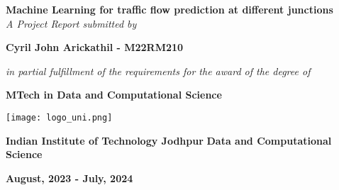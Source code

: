 \begin{titlepage}

    
    \begin{flushright}
        
   
       
    \vspace*{3\baselineskip}

    
   

    {\LARGE \bfseries Machine Learning for traffic flow prediction at different junctions}\\[0.3cm]
    
    \vspace*{4\baselineskip}
    {\Large \itshape A Project Report submitted by}
    \vspace*{1\baselineskip}

    {\Large  \bfseries Cyril John Arickathil - M22RM210 }

   
    \vspace*{4\baselineskip}




     {\large \itshape in partial fulfillment of the requirements for the award of the degree of} 
    \vspace*{0.5\baselineskip}

    {\Large \bfseries  MTech in Data and Computational Science }  
    \vspace*{2\baselineskip}



    \texttt{[image: logo\_uni.png]}
    \vspace*{2\baselineskip}

    {\Large \bfseries  Indian Institute of Technology Jodhpur }  
    \vspace*{1\baselineskip}
    {\Large \bfseries  Data and Computational Science }  
    \vspace*{1\baselineskip}

    {\Large \bfseries  August, 2023 - July, 2024 }  

    

\end{flushright}
   
    
\end{titlepage}